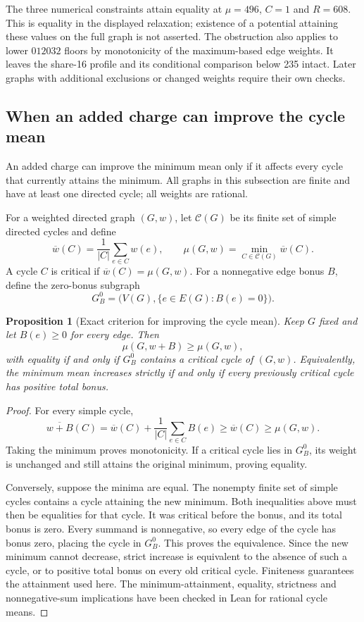 \documentclass[11pt,a4paper]{article}
\newtheorem{proposition}[theorem]{Proposition}
\theoremstyle{definition}
\theoremstyle{remark}
\begin{document}
The three numerical constraints attain equality at
$\mu=496$, $C=1$ and $R=608$. This is equality in the displayed relaxation;
existence of a potential attaining these values on the full graph is not
asserted. The obstruction also applies to lower $012032$ floors by
monotonicity of the maximum-based edge weights. It leaves the share-16
profile and its conditional comparison below 235 intact. Later graphs with
additional exclusions or changed weights require their own checks.


\subsection{When an added charge can improve the cycle mean}\label{sec:bonus-criterion}
An added charge can improve the minimum mean only if it affects every
cycle that currently attains the minimum. All graphs in this subsection are finite and have
at least one directed cycle; all weights are rational.

\label{def:zero-bonus}
For a weighted directed graph $(G,w)$, let $\mathcal C(G)$ be its finite set
of simple directed cycles and define
\[
\overline w(C)=\frac{1}{|C|}\sum_{e\in C}w(e),\qquad
\mu(G,w)=\min_{C\in\mathcal C(G)}\overline w(C).
\]
A cycle $C$ is critical if $\overline w(C)=\mu(G,w)$. For a nonnegative
edge bonus $B$, define the zero-bonus subgraph
\[
G_B^0=\bigl(V(G),\{e\in E(G):B(e)=0\}\bigr).
\]

\begin{proposition}[Exact criterion for improving the cycle mean]\label{prop:bonus-criterion}
Keep $G$ fixed and let $B(e)\ge0$ for every edge. Then
\[
\mu(G,w+B)\ge\mu(G,w),
\]
with equality if and only if $G_B^0$ contains a critical cycle of $(G,w)$.
Equivalently, the minimum mean increases strictly if and only if every
previously critical cycle has positive total bonus.
\end{proposition}
\begin{proof}
For every simple cycle,
\[
\overline{w+B}(C)=\overline w(C)+\frac{1}{|C|}\sum_{e\in C}B(e)
\ge\overline w(C)\ge\mu(G,w).
\]
Taking the minimum proves monotonicity. If a critical cycle lies in $G_B^0$,
its weight is unchanged and still attains the original minimum, proving
equality.

Conversely, suppose the minima are equal. The nonempty finite set of simple
cycles contains a cycle attaining the new minimum. Both inequalities above
must then be equalities for that cycle. It was critical before the bonus,
and its total bonus is zero. Every summand is nonnegative, so every edge of
the cycle has bonus zero, placing the cycle in $G_B^0$. This proves the
equivalence. Since the new minimum cannot decrease, strict increase is
equivalent to the absence of such a cycle, or to positive total bonus on
every old critical cycle. Finiteness guarantees the attainment used here.
The minimum-attainment, equality, strictness and nonnegative-sum implications
have been checked in Lean for rational cycle means.
\end{proof}
\end{document}
